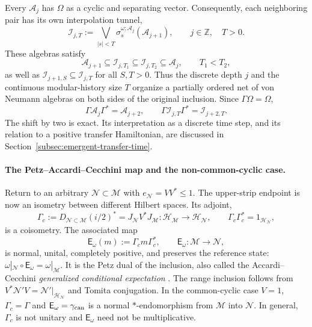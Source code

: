 \documentclass[a4paper,11pt]{article}
\theoremstyle{definition}
\newcommand{\mA}{\mathcal{A}}%
\newcommand{\mN}{\mathcal{N}}
\newcommand{\mI}{\mathcal{I}}
\newcommand{\mH}{\mathcal{H}}
\newcommand{\mM}{\mathcal{M}}
\begin{document}
Every $\mA_j$ has $\Omega$ as a cyclic and separating vector.
Consequently, each neighboring pair has its own interpolation tunnel,
\begin{equation}
 \boxed{\quad
 \mI_{j,T}:=
 \bigvee_{|s|<T}
 \sigma_s^{\omega;\mA_j}(\mA_{j+1}),
 \qquad j\in\mathbb Z,\quad T>0.
 \quad}
 \label{eq:interpolation-tower-net}
\end{equation}
These algebras satisfy
\begin{equation}
 \mA_{j+1}\subseteq\mI_{j,T_1}
 \subseteq\mI_{j,T_2}\subseteq\mA_j,
 \qquad T_1<T_2,
 \label{eq:interpolation-tower-net-order}
\end{equation}
as well as $\mI_{j+1,S}\subseteq\mI_{j,T}$ for all $S,T>0$.
Thus the discrete depth $j$ and the continuous modular-history size $T$
organize a partially ordered net of von Neumann algebras on both
sides of the original inclusion. Since $\Gamma\Omega=\Omega$,
\begin{equation}
 \boxed{\quad
 \Gamma\mA_j\Gamma^*=\mA_{j+2},\qquad
 \Gamma\mI_{j,T}\Gamma^*=\mI_{j+2,T}.
 \quad}
 \label{eq:interpolation-shift-covariance}
\end{equation}
The shift by two is exact. Its interpretation as a discrete time step,
and its relation to a positive transfer Hamiltonian, are discussed in
Section~\ref{subsec:emergent-transfer-time}.

\paragraph{The Petz--Accardi--Cecchini map and the non-common-cyclic case.}
Return to an arbitrary $\mN\subset\mM$ with $e_{\mN}=VV^*\leq1$.
The upper-strip endpoint is now an isometry between different
Hilbert spaces. Its adjoint,
\begin{equation}
 \Gamma_c:=D_{\mN\subset\mM}(i/2)^*
 =J_{\mN}V^*J_{\mM}:\mH_{\mM}\longrightarrow\mH_{\mN},
 \qquad \Gamma_c\Gamma_c^*=1_{\mH_{\mN}},
 \label{eq:interpolation-Gamma-compressed}
\end{equation}
is a coisometry. The associated map
\begin{equation}
 \boxed{\quad
 \mathsf E_\omega(m):=\Gamma_c m\Gamma_c^*,
 \qquad \mathsf E_\omega:\mM\longrightarrow\mN,
 \quad}
 \label{eq:interpolation-Petz-map}
\end{equation}
is normal, unital, completely positive, and preserves the reference
state: $\omega|_{\mN}\circ\mathsf E_\omega=\omega|_{\mM}$.
It is the Petz dual of the inclusion, also called the
Accardi--Cecchini \emph{generalized conditional expectation}
\cite{Petz1988,AccardiCecchini1982}. The range inclusion follows
from $V^*\mN'V=\mN'|_{\mH_{\mN}}$ and Tomita conjugation.
In the common-cyclic case $V=1$, $\Gamma_c=\Gamma$ and
$\mathsf E_\omega=\gamma_{\rm can}$ is a normal $*$-endomorphism
from $\mM$ into $\mN$. In general, $\Gamma_c$ is not unitary
and $\mathsf E_\omega$ need not be multiplicative.
\end{document}
